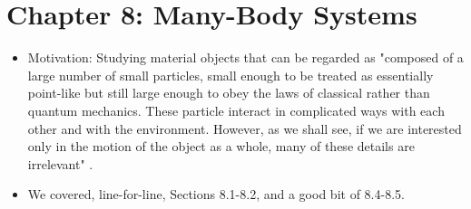 \documentclass[../notes.tex]{subfiles}
\begin{document}
\section{Chapter 8: Many-Body Systems}
\begin{itemize}
    \item {}Motivation: Studying material objects that can be regarded as "composed of a large number of small particles, small enough to be treated as essentially point-like but still large enough to obey the laws of classical rather than quantum mechanics. These particle interact in complicated ways with each other and with the environment. However, as we shall see, if we are interested only in the motion of the object as a whole, many of these details are irrelevant" \parencite[177]{bib:KibbleBerkshire}.
    \item We covered, line-for-line, Sections 8.1-8.2, and a good bit of 8.4-8.5.
\end{itemize}
\end{document}
